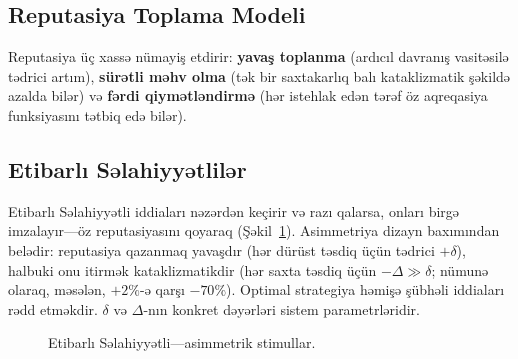 \documentclass[11pt,a4paper,twocolumn]{article}
\begin{document}
\subsection{Reputasiya Toplama Modeli}

Reputasiya üç xassə nümayiş etdirir: \textbf{yavaş toplanma} (ardıcıl davranış vasitəsilə tədrici artım), \textbf{sürətli məhv olma} (tək bir saxtakarlıq balı kataklizmatik şəkildə azalda bilər) və \textbf{fərdi qiymətləndirmə} (hər istehlak edən tərəf öz aqreqasiya funksiyasını tətbiq edə bilər).

\subsection{Etibarlı Səlahiyyətlilər}

Etibarlı Səlahiyyətli iddiaları nəzərdən keçirir və razı qalarsa, onları birgə imzalayır---öz reputasiyasını qoyaraq (Şəkil~\ref{fig:authority}). Asimmetriya dizayn baxımından belədir: reputasiya qazanmaq yavaşdır (hər dürüst təsdiq üçün tədrici $+\delta$), halbuki onu itirmək kataklizmatikdir (hər saxta təsdiq üçün $-\Delta \gg \delta$; nümunə olaraq, məsələn, $+2\%$-ə qarşı $-70\%$). Optimal strategiya həmişə şübhəli iddiaları rədd etməkdir. $\delta$ və $\Delta$-nın konkret dəyərləri sistem parametrləridir.

\begin{figure}[ht]
\centering
{}
\caption{Etibarlı Səlahiyyətli---asimmetrik stimullar.}
\label{fig:authority}
\end{figure}
\end{document}
